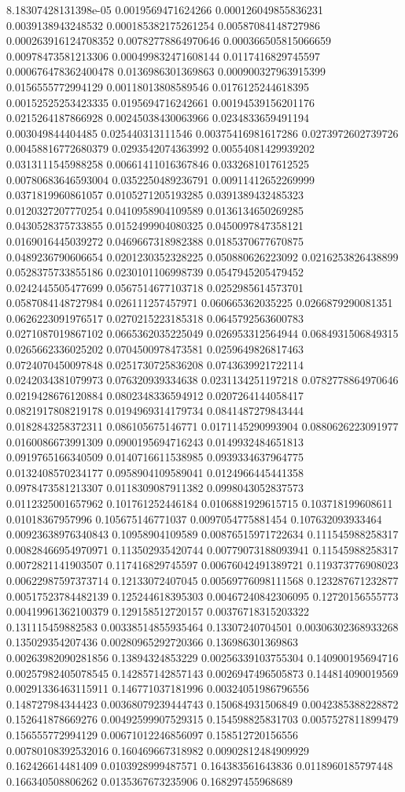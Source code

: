 \begin{table}
\begin{tabu}
\begin{sparkline}{10}
 8.18307428131398e-05 0.0019569471624266 0.000126049855836231 0.0039138943248532 0.000185382175261254 0.00587084148727986 0.000263916124708352 0.00782778864970646 0.000366505815066659 0.00978473581213306 0.000499832471608144 0.0117416829745597 0.000676478362400478 0.0136986301369863 0.000900327963915399 0.0156555772994129 0.00118013808589546 0.0176125244618395 0.00152525253423335 0.0195694716242661 0.00194539156201176 0.0215264187866928 0.00245038430063966 0.0234833659491194 0.003049844404485 0.025440313111546 0.00375416981617286 0.0273972602739726 0.00458816772680379 0.0293542074363992 0.00554081429939202 0.0313111545988258 0.00661411016367846 0.0332681017612525 0.00780683646593004 0.0352250489236791 0.00911412652269999 0.0371819960861057 0.0105271205193285 0.0391389432485323 0.0120327207770254 0.0410958904109589 0.0136134650269285 0.0430528375733855 0.0152499904080325 0.0450097847358121 0.0169016445039272 0.0469667318982388 0.0185370677670875 0.0489236790606654 0.0201230352328225 0.050880626223092 0.0216253826438899 0.0528375733855186 0.0230101106998739 0.0547945205479452 0.0242445505477699 0.0567514677103718 0.0252985614573701 0.0587084148727984 0.026111257457971 0.060665362035225 0.0266879290081351 0.0626223091976517 0.0270215223185318 0.0645792563600783 0.0271087019867102 0.0665362035225049 0.026953312564944 0.0684931506849315 0.0265662336025202 0.0704500978473581 0.0259649826817463 0.0724070450097848 0.0251730725836208 0.0743639921722114 0.0242034381079973 0.076320939334638 0.0231134251197218 0.0782778864970646 0.0219428676120884 0.0802348336594912 0.0207264144058417 0.0821917808219178 0.0194969314179734 0.0841487279843444 0.0182843258372311 0.086105675146771 0.0171145290993904 0.0880626223091977 0.0160086673991309 0.0900195694716243 0.0149932484651813 0.0919765166340509 0.0140716611538985 0.0939334637964775 0.0132408570234177 0.0958904109589041 0.0124966445441358 0.0978473581213307 0.0118309087911382 0.0998043052837573 0.0112325001657962 0.101761252446184 0.0106881929615715 0.103718199608611 0.01018367957996 0.105675146771037 0.0097054775881454 0.107632093933464 0.00923638976340843 0.10958904109589 0.00876515971722634 0.111545988258317 0.00828466954970971 0.113502935420744 0.00779073188093941 0.11545988258317 0.0072821141903507 0.117416829745597 0.00676042491389721 0.119373776908023 0.00622987597373714 0.12133072407045 0.00569776098111568 0.123287671232877 0.00517523784482139 0.125244618395303 0.00467240842306095 0.12720156555773 0.00419961362100379 0.129158512720157 0.00376718315203322 0.131115459882583 0.00338514855935464 0.13307240704501 0.00306302368933268 0.135029354207436 0.00280965292720366 0.136986301369863 0.00263982090281856 0.13894324853229 0.00256339103755304 0.140900195694716 0.00257982405078545 0.142857142857143 0.0026947496505873 0.144814090019569 0.00291336463115911 0.146771037181996 0.00324051986796556 0.148727984344423 0.00368079239444743 0.150684931506849 0.0042385388228872 0.152641878669276 0.00492599907529315 0.154598825831703 0.0057527811899479 0.156555772994129 0.00671012246856097 0.158512720156556 0.00780108392532016 0.160469667318982 0.00902812484909929 0.162426614481409 0.0103928999487571 0.164383561643836 0.0118960185797448 0.166340508806262 0.0135367673235906 0.168297455968689 
\end{sparkline}
\end{tabu}
\end{table}

